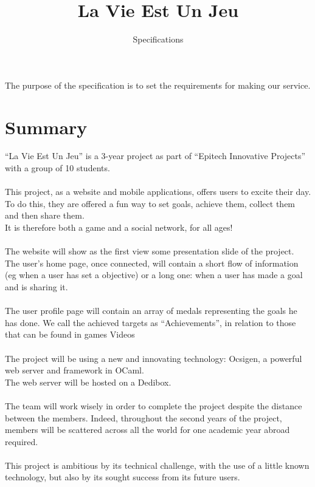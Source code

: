 \documentclass {life-en}
\begin{document}
\title{La Vie Est Un Jeu}
\subtitle{Specifications}

\summary
{
        The purpose of the specification is to set the requirements for making our service.
}

\maketitle
\authorspageen


\chapter*{Summary}
{
  ``La Vie Est Un Jeu'' is a 3-year project as part of ``Epitech
  Innovative Projects'' with a group of 10 students.\\
  \\
  This project, as a website and mobile applications, offers
  users to excite their day. To do this, they are offered a
  fun way to set goals, achieve them, collect them
  and then share them.\\
  It is therefore both a game and a social network, for all ages!\\
  \\
  The website will show as the first view some presentation slide of
  the project. The user's home page, once connected, will contain a
  short flow of information (eg when a user has set a
  objective) or a long one: when a user has made a goal and is sharing it.
  \\\\
  The user profile page will contain an array of medals representing
  the goals he has done. We call the achieved targets as
  ``Achievements'', in relation to those that can be found in games
  Videos\\
  \\
  The project will be using a new and innovating technology:
  Ocsigen, a powerful web server and framework in OCaml.\\
  The web server will be hosted on a Dedibox.\\
  \\
  The team will work wisely in order to complete the project
  despite the distance between the members. Indeed, throughout the second
  years of the project, members will be scattered across all
  the world for one academic year abroad required.\\
  \\
  This project is ambitious by its technical challenge, with the use of a
  little known technology, but also by its sought success from its future users.
}
\end{document}
